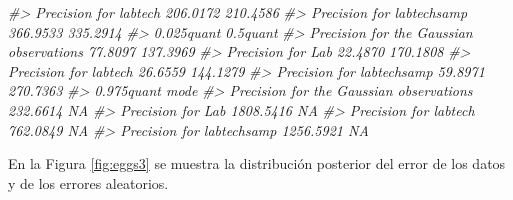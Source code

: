 \documentclass[
]{book}
\newenvironment{Shaded}{\begin{snugshade}}{\end{snugshade}}
\newcommand{\AttributeTok}[1]{\textcolor[rgb]{0.77,0.63,0.00}{#1}}
\newcommand{\CommentTok}[1]{\textcolor[rgb]{0.56,0.35,0.01}{\textit{#1}}}
\newcommand{\ConstantTok}[1]{\textcolor[rgb]{0.00,0.00,0.00}{#1}}
\newcommand{\ControlFlowTok}[1]{\textcolor[rgb]{0.13,0.29,0.53}{\textbf{#1}}}
\newcommand{\DecValTok}[1]{\textcolor[rgb]{0.00,0.00,0.81}{#1}}
\newcommand{\FunctionTok}[1]{\textcolor[rgb]{0.00,0.00,0.00}{#1}}
\newcommand{\NormalTok}[1]{#1}
\newcommand{\OtherTok}[1]{\textcolor[rgb]{0.56,0.35,0.01}{#1}}
\newcommand{\SpecialCharTok}[1]{\textcolor[rgb]{0.00,0.00,0.00}{#1}}
\newcommand{\StringTok}[1]{\textcolor[rgb]{0.31,0.60,0.02}{#1}}
\begin{document}
\begin{Shaded}
\begin{Highlighting}[]
\CommentTok{\#\textgreater{} Precision for labtech                   206.0172 210.4586}
\CommentTok{\#\textgreater{} Precision for labtechsamp               366.9533 335.2914}
\CommentTok{\#\textgreater{}                                         0.025quant 0.5quant}
\CommentTok{\#\textgreater{} Precision for the Gaussian observations    77.8097 137.3969}
\CommentTok{\#\textgreater{} Precision for Lab                          22.4870 170.1808}
\CommentTok{\#\textgreater{} Precision for labtech                      26.6559 144.1279}
\CommentTok{\#\textgreater{} Precision for labtechsamp                  59.8971 270.7363}
\CommentTok{\#\textgreater{}                                         0.975quant mode}
\CommentTok{\#\textgreater{} Precision for the Gaussian observations   232.6614   NA}
\CommentTok{\#\textgreater{} Precision for Lab                        1808.5416   NA}
\CommentTok{\#\textgreater{} Precision for labtech                     762.0849   NA}
\CommentTok{\#\textgreater{} Precision for labtechsamp                1256.5921   NA}
\end{Highlighting}
\end{Shaded}

En la Figura \ref{fig:eggs3} se muestra la distribución posterior del error de los datos y de los errores aleatorios.

\begin{Shaded}
\end{Shaded}
\end{document}
